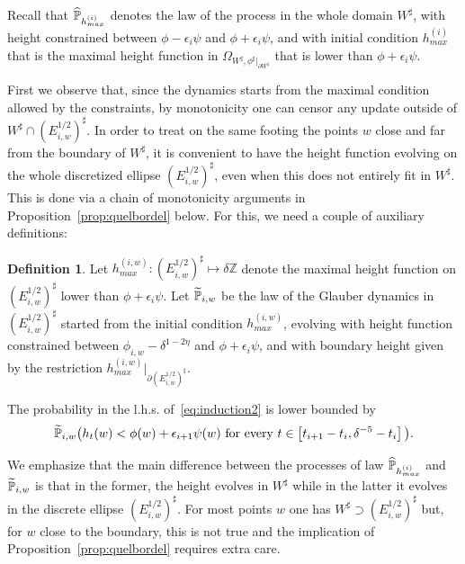 \documentclass[10pt]{amsart}
\theoremstyle{definition}\newtheorem{defi}[theo]{Definition}\newtheorem{rema}[theo]{Remark}\newtheorem{exam}[theo]{Example}\newtheorem{exem}[theo]{Example}\newtheorem{nota}[theo]{Notation}
\newcommand{\Z}{\mathbb{Z}}
\renewcommand{\P}{\mathbb{P}}
\newcommand{\eps}{\epsilon}
\renewcommand{\d}{{\sharp }}
\let\oldtilde\tilde
\renewcommand*{\tilde}[1]{\mathchoice{\widetilde{#1}}{\widetilde{#1}}{\oldtilde{#1}}{\oldtilde{#1}}}
\let\oldhat\hat
\renewcommand*{\hat}[1]{\mathchoice{\widehat{#1}}{\widehat{#1}}{\oldhat{#1}}{\oldhat{#1}}}
\begin{document}
Recall that $\hat\P_{h^{(i)}_{max}}$ denotes the law of the process in the whole domain $W^\d$, with height constrained between $\phi-\epsilon_i\psi$ and $\phi+\epsilon_i\psi$, and with initial condition $h^{(i)}_{max}$ that is the maximal height function in $\Omega_{W^\d,\phi^\d|_{\partial W^\d}}$ that is lower than $\phi+\epsilon_i\psi$.

First we observe that, since the dynamics starts from the maximal condition allowed by the constraints, by monotonicity one can censor any update outside of $W^\d \cap (E^{1/2}_{i,w})^\d$. In order to treat on the same footing the points $w$ close and far from the boundary of $W^\d$, it is convenient to have the height function evolving on the whole discretized ellipse $(E^{1/2}_{i,w})^\d$, even when this does not entirely fit in $W^\d$. This is done via a chain of monotonicity arguments in Proposition~\ref{prop:quelbordel} below. For this, we need a couple of auxiliary definitions:
\begin{defi}
Let $h_{max}^{(i,w)}:(E^{1/2}_{i,w})^\d\mapsto \delta\Z$ denote the maximal height function on $(E^{1/2}_{i,w})^\d$ lower than $\phi+\epsilon_i\psi$. Let $\tilde\P_{i,w}$ be the law of the Glauber dynamics in $(E^{1/2}_{i,w})^\d$ started from the initial condition $ h_{max}^{(i,w)}$, evolving with height function constrained between $\phi_{i,w}-\delta^{1-2\eta}$ and $\phi+\epsilon_i\psi$, and with boundary height given by the restriction $h_{max}^{(i,w)}|_{\partial (E^{1/2}_{i,w})^\d}$.
\end{defi}

\begin{prop}\label{prop:quelbordel}
The probability in the l.h.s. of~\eqref{eq:induction2} is lower bounded by
\begin{equation}\label{eq:tildep}
\tilde \P_{i,w}\big(h_t(w) < \phi(w) + \eps_{i+1} \psi(w) \text{ for every } t\in \left[t_{i+1} - t_i, \delta^{-5}- t_i\right]\big).
\end{equation}
\end{prop}

We emphasize that the main difference between the processes of law $\hat \P_{h^{(i)}_{max}}$ and $\tilde \P_{i,w}$ is that in the former, the height evolves in $W^\d$ while in the latter it evolves in the discrete ellipse $(E^{1/2}_{i,w})^\d$. For most points $w$ one has $W^\d\supset (E^{1/2}_{i,w})^\d$ but, for $w$ close to the boundary, this is not true and the implication of Proposition~\ref{prop:quelbordel} requires extra care.
\end{document}
